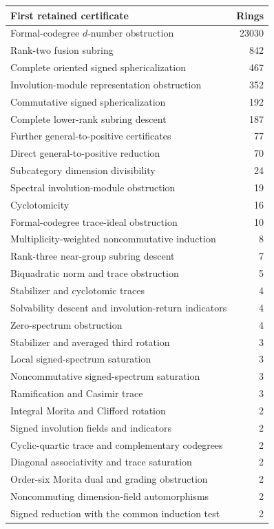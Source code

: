 \begin{table}[ht]\centering
\begin{tabular}{lr}\toprule
First retained certificate & Rings\\\midrule
Formal-codegree $d$-number obstruction & 23030\\
Rank-two fusion subring & 842\\
Complete oriented signed sphericalization & 467\\
Involution-module representation obstruction & 352\\
Commutative signed sphericalization & 192\\
Complete lower-rank subring descent & 187\\
Further general-to-positive certificates & 77\\
Direct general-to-positive reduction & 70\\
Subcategory dimension divisibility & 24\\
Spectral involution-module obstruction & 19\\
Cyclotomicity & 16\\
Formal-codegree trace-ideal obstruction & 10\\
Multiplicity-weighted noncommutative induction & 8\\
Rank-three near-group subring descent & 7\\
Biquadratic norm and trace obstruction & 5\\
Stabilizer and cyclotomic traces & 4\\
Solvability descent and involution-return indicators & 4\\
Zero-spectrum obstruction & 4\\
Stabilizer and averaged third rotation & 3\\
Local signed-spectrum saturation & 3\\
Noncommutative signed-spectrum saturation & 3\\
Ramification and Casimir trace & 3\\
Integral Morita and Clifford rotation & 2\\
Signed involution fields and indicators & 2\\
Cyclic-quartic trace and complementary codegrees & 2\\
Diagonal associativity and trace saturation & 2\\
Order-six Morita dual and grading obstruction & 2\\
Noncommuting dimension-field automorphisms & 2\\
Signed reduction with the common induction test & 2\\

\end{tabular}
\end{table}
